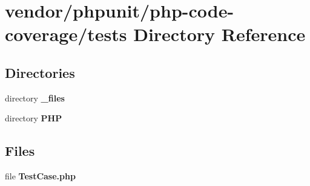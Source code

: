 \section{vendor/phpunit/php-\/code-\/coverage/tests Directory Reference}
\label{dir_18b63a68f10abb51955dd3190db8d956}
\subsection*{Directories}
\begin{DoxyCompactItemize}
\item 
directory {\bf \+\_\+files}
\item 
directory {\bf P\+H\+P}
\end{DoxyCompactItemize}
\subsection*{Files}
\begin{DoxyCompactItemize}
\item 
file {\bf Test\+Case.\+php}
\end{DoxyCompactItemize}

